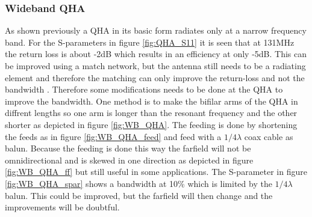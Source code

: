 \subsubsection{Wideband QHA}
As shown previously a QHA in its basic form radiates only at a narrow frequency band. For the S-parameters in figure \ref{fig:QHA_S11} it is seen that at 131MHz the return loss is about -2dB which results in an efficiency at only -5dB. This can be improved using a match network, but the antenna still needs to be a radiating element and therefore the matching can only improve the return-loss and not the bandwidth \citep{Iyver2010}. Therefore some modifications needs to be done at the QHA to improve the bandwidth. One method is to make the bifilar arms of the QHA in diffrent lengths so one arm is longer than the resonant frequency and the other shorter as depicted in figure \ref{fig:WB_QHA}. The feeding is done by shortening the feeds as in figure \ref{fig:WB_QHA_feed} and feed with a $1/4\lambda$ coax cable as balun. Because the feeding is done this way the farfield will not be omnidirectional and is skewed in one direction as depicted in figure \ref{fig:WB_QHA_ff} but still useful in some applications. The S-parameter in figure \ref{fig:WB_QHA_spar} shows a bandwidth at 10\% which is limited by the $1/4\lambda$ balun. This could be improved, but the farfield will then change and the improvements will be doubtful.       


